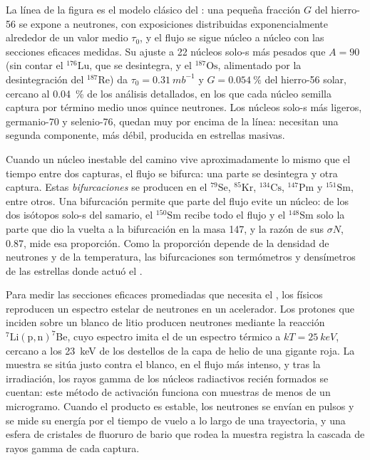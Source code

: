 La línea de la figura es el modelo clásico del : una pequeña
fracción $G$ del hierro-56 se expone a neutrones, con exposiciones distribuidas
exponencialmente alrededor de un valor medio $\tau_0$, y el flujo se sigue núcleo a núcleo
con las secciones eficaces medidas. Su ajuste a 22 núcleos solo-s
más pesados que $A = 90$ (sin contar el $^{176}\mathrm{Lu}$, que
se desintegra, y el $^{187}\mathrm{Os}$, alimentado por la desintegración del
$^{187}\mathrm{Re}$) da $\tau_0 = \qty{0.31}{mb^{-1}}$ y
$G = \qty{0.054}{\percent}$ del hierro-56 solar, cercano al
\qty{0.04}{\percent} de los análisis detallados, en los que cada núcleo
semilla captura por término medio unos quince neutrones. Los núcleos solo-s
más ligeros, germanio-70 y selenio-76, quedan muy por encima de la línea: necesitan
una segunda componente, más débil, producida en estrellas masivas.

Cuando un núcleo inestable del camino vive aproximadamente lo mismo que el tiempo
entre dos capturas, el flujo se bifurca: una parte se desintegra y otra captura.
Estas \emph{bifurcaciones} se producen en el $^{79}\mathrm{Se}$, $^{85}\mathrm{Kr}$,
$^{134}\mathrm{Cs}$, $^{147}\mathrm{Pm}$ y $^{151}\mathrm{Sm}$, entre
otros. Una bifurcación permite que parte del flujo evite un núcleo: de los dos
isótopos solo-s del samario, el $^{150}\mathrm{Sm}$ recibe todo
el flujo y el $^{148}\mathrm{Sm}$ solo la parte que dio la vuelta a la
bifurcación en la masa 147, y la razón de sus $\sigma N$, \num{0.87},
mide esa proporción. Como la proporción depende de la densidad de neutrones y
de la temperatura, las bifurcaciones son termómetros y densímetros de las
estrellas donde actuó el .

\begin{inthelab}
Para medir las secciones eficaces promediadas que necesita el ,
los físicos reproducen un espectro estelar de neutrones en un acelerador.
Los protones que inciden sobre un blanco de litio producen neutrones mediante la reacción
$^{7}\mathrm{Li}(\mathrm{p},\mathrm{n})^{7}\mathrm{Be}$, cuyo espectro
imita el de un espectro térmico a $kT = \qty{25}{keV}$, cercano a los
\qty{23}{keV} de los destellos de la capa de helio de una gigante roja. La muestra se sitúa
justo contra el blanco, en el flujo más intenso, y tras la
irradiación, los rayos gamma de los núcleos radiactivos recién formados
se cuentan: este método de activación funciona con muestras de menos de un
microgramo. Cuando el producto es estable, los neutrones se envían en pulsos
y se mide su energía por el tiempo de vuelo a lo largo de una trayectoria, y una esfera de
cristales de fluoruro de bario que rodea la muestra registra la cascada de rayos gamma
de cada captura.
\end{inthelab}

